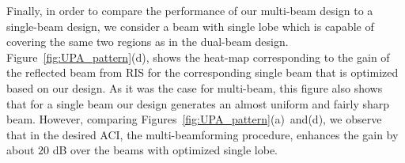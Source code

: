 Finally, in order to compare the performance of our multi-beam design to a single-beam design, we consider a beam with single lobe which is capable of covering the same two regions as in the dual-beam design. Figure~\ref{fig:UPA_pattern}(d), shows the heat-map corresponding to the gain of the reflected beam from RIS for the corresponding single beam that is optimized based on our design. As it was the case for multi-beam, this figure also shows that for a single beam our design generates an almost uniform and fairly sharp beam. However, comparing Figures~\ref{fig:UPA_pattern}(a)~and(d), we observe that in the desired ACI, the multi-beamforming procedure, enhances the gain by about $20$ dB over the beams with optimized single lobe.  















